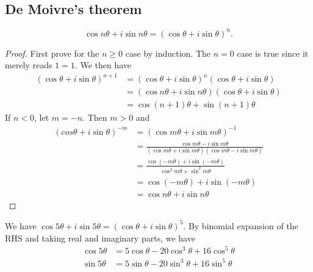 \documentclass[a4paper]{article}
\begin{document}
\subsection{De Moivre's theorem}
\begin{thm}
\[
\cos n\theta + i\sin n\theta = (\cos\theta + i\sin\theta)^n.
\]
\end{thm}
\begin{proof}
  First prove for the $n \geq 0$ case by induction. The $n = 0$ case is true since it merely reads $1 = 1$. We then have
  \begin{align*}
    (\cos\theta + i\sin\theta)^{n + 1} &= (\cos\theta + i\sin\theta)^n (\cos\theta + i\sin\theta)\\
    &= (\cos n\theta + i\sin n\theta )(\cos\theta + i\sin\theta)\\
    &= \cos(n+1)\theta + \sin(n+1)\theta
  \end{align*}
  If $n < 0$, let $m = -n$. Then $m > 0$ and
  \begin{align*}
    (cos\theta + i\sin\theta)^{-m} &= (\cos m\theta + i\sin m\theta)^{-1}\\
    &= \frac{\cos m\theta - i\sin m\theta}{(\cos m\theta + i\sin m\theta)(\cos m\theta - i\sin m\theta)}\\
    &= \frac{\cos (-m\theta) + i\sin (-m\theta)}{\cos^2 m\theta + \sin^2 m\theta}\\
    &= \cos (-m\theta) + i\sin (-m\theta)\\
    &= \cos n\theta + i\sin n\theta
  \end{align*}
\end{proof}

\begin{eg}
  We have $\cos 5\theta + i\sin5\theta  = (\cos\theta + i\sin\theta)^5$. By binomial expansion of the RHS and taking real and imaginary parts, we have
  \begin{align*}
    \cos 5\theta &= 5\cos\theta - 20\cos^3\theta + 16\cos^5\theta\\
    \sin 5\theta &= 5\sin\theta - 20\sin^3\theta + 16\sin^5\theta
  \end{align*}
\end{eg}
\end{document}
